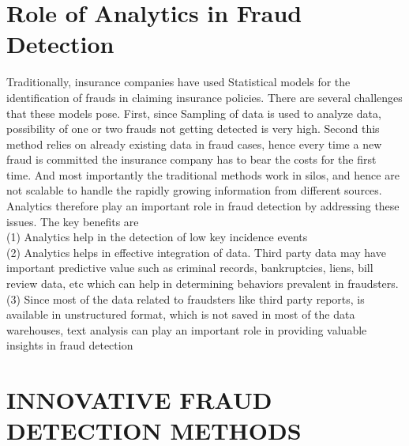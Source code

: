 \documentclass[sigconf]{acmart}
\begin{document}
\section{Role of Analytics in Fraud Detection} 
Traditionally, insurance companies have used Statistical models for the identification of frauds in claiming insurance policies. There are several challenges that these models pose. First, since Sampling of data is used to analyze data, possibility of one or two frauds not getting detected is very high. Second this method relies on already existing data in fraud cases, hence every time a new fraud is committed the insurance company has to bear the costs for the first time. And most importantly the traditional methods work in silos, and hence are not scalable to handle the rapidly growing information from different sources. Analytics therefore play an important role in fraud detection by addressing these issues. The key benefits are\\
(1) Analytics help in the detection of low key incidence events \\
(2) Analytics helps in effective integration of data. Third party data may have important predictive value such as criminal records, bankruptcies, liens, bill review data, etc which can help in determining behaviors prevalent in fraudsters.\\
(3) Since most of the data related to fraudsters like third party reports, is available in unstructured format, which is not saved in most of the data warehouses, text analysis can play an important role in providing valuable insights in fraud detection\cite{link7}

\section{INNOVATIVE FRAUD DETECTION METHODS}
\end{document}
